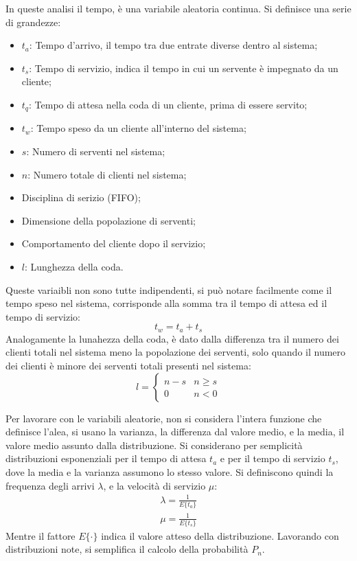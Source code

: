 \documentclass{article}
\numberwithin{equation}{subsection}
\begin{document}
In queste analisi il tempo, è una variabile aleatoria continua. Si definisce una serie di grandezze:
\begin{itemize}
    \item $t_a$: Tempo d'arrivo, il tempo tra due entrate diverse dentro al sistema;
    \item $t_s$: Tempo di servizio, indica il tempo in cui un servente è impegnato da un cliente;
    \item $t_q$: Tempo di attesa nella coda di un cliente, prima di essere servito;
    \item $t_w$: Tempo speso da un cliente all'interno del sistema;
    \item $s$: Numero di serventi nel sistema;
    \item $n$: Numero totale di clienti nel sistema;
    \item Disciplina di serizio (FIFO);
    \item Dimensione della popolazione di serventi;
    \item Comportamento del cliente dopo il servizio;
    \item $l$: Lunghezza della coda. 
\end{itemize}
Queste variaibli non sono tutte indipendenti, si può notare facilmente come il tempo speso nel sistema, corrisponde alla somma tra il tempo di attesa ed il tempo di 
servizio:
\begin{equation}
    t_w=t_a+t_s
\end{equation}
Analogamente la lunahezza della coda, è dato dalla differenza tra il numero dei clienti totali nel sistema meno la popolazione dei serventi, solo quando il numero dei 
clienti è minore dei serventi totali presenti nel sistema:
\begin{equation}
    l=\begin{cases}
        n-s&n\geq s\\
        0&n<0
    \end{cases}
\end{equation}

Per lavorare con le variabili aleatorie, non si considera l'intera funzione che definisce l'alea, si usano la varianza, la differenza dal valore medio, e la media, il valore medio 
assunto dalla distribuzione. Si considerano per semplicità distribuzioni esponenziali per il tempo di attesa $t_a$ e per il tempo di servizio $t_s$, dove la media e la 
varianza assumono lo stesso valore. Si definiscono quindi la frequenza degli arrivi $\lambda$, e la velocità di servizio $\mu$:
\begin{gather}
    \lambda=\displaystyle\frac{1}{E\{t_a\}}\\
    \mu=\displaystyle\frac{1}{E\{t_s\}}
\end{gather}
Mentre il fattore $E\{\cdot\}$ indica il valore atteso della distribuzione. Lavorando con distribuzioni note, si semplifica il calcolo della probabilità $P_n$. 
\end{document}
